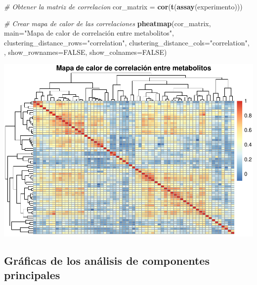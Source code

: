 \documentclass[
]{article}
\newenvironment{Shaded}{\begin{snugshade}}{\end{snugshade}}
\newcommand{\AttributeTok}[1]{\textcolor[rgb]{0.13,0.29,0.53}{#1}}
\newcommand{\CommentTok}[1]{\textcolor[rgb]{0.56,0.35,0.01}{\textit{#1}}}
\newcommand{\ConstantTok}[1]{\textcolor[rgb]{0.56,0.35,0.01}{#1}}
\newcommand{\FunctionTok}[1]{\textcolor[rgb]{0.13,0.29,0.53}{\textbf{#1}}}
\newcommand{\NormalTok}[1]{#1}
\newcommand{\OtherTok}[1]{\textcolor[rgb]{0.56,0.35,0.01}{#1}}
\newcommand{\StringTok}[1]{\textcolor[rgb]{0.31,0.60,0.02}{#1}}
\begin{document}
\begin{Shaded}
\begin{Highlighting}[]
\CommentTok{\# Obtener la matriz de correlacion}
\NormalTok{cor\_matrix }\OtherTok{=} \FunctionTok{cor}\NormalTok{(}\FunctionTok{t}\NormalTok{(}\FunctionTok{assay}\NormalTok{(experimento)))}

\CommentTok{\# Crear mapa de calor de las correlaciones}
\FunctionTok{pheatmap}\NormalTok{(cor\_matrix, }\AttributeTok{main=}\StringTok{"Mapa de calor de correlación entre metabolitos"}\NormalTok{, }\AttributeTok{clustering\_distance\_rows=}\StringTok{"correlation"}\NormalTok{, }\AttributeTok{clustering\_distance\_cols=}\StringTok{"correlation"}\NormalTok{, , }\AttributeTok{show\_rownames=}\ConstantTok{FALSE}\NormalTok{, }\AttributeTok{show\_colnames=}\ConstantTok{FALSE}\NormalTok{)}
\end{Highlighting}
\end{Shaded}

\includegraphics{PEC1_files/figure-latex/unnamed-chunk-10-1.pdf}

\subsection{Gráficas de los análisis de componentes
principales}\label{gruxe1ficas-de-los-anuxe1lisis-de-componentes-principales}
\end{document}
